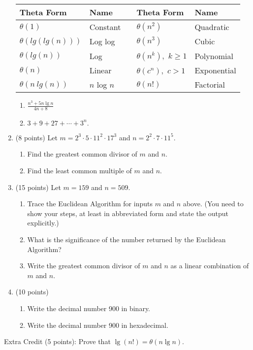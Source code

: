 \documentclass[12pt]{article}
\newcommand{\be}{\begin{enumerate}}
\newcommand{\ee}{\end{enumerate}}
\begin{document}
\begin{enumerate}
\begin{tabular}{l|l|c|l|l}
Theta Form & Name &&Theta Form & Name \\
\hline
\hline
$\theta(1)$& Constant &&$\theta(n^2)$&Quadratic\\
\hline
$\theta(lg(lg(n)))$& Log log&& $\theta(n^3)$&Cubic\\
\hline 
$\theta(lg(n))$& Log && $\theta(n^k),$ $k \geq 1$&Polynomial\\
\hline 
$\theta(n)$&Linear&& $\theta(c^n),$ $c>1$&Exponential\\
\hline 
$\theta(n~lg(n))$& $n$ log $n$&& $\theta(n!)$&Factorial\\
\hline 
\end{tabular}
\be
\item $\frac{n^3+5n\lg n}{4n+8}$
\vfill
\item $3+9+27+\cdots+3^n.$
\vfill
\ee
\newpage
\item (8 points) Let $m=2^3\cdot 5\cdot 11^2\cdot 17^3$ and $n=2^2\cdot 7 \cdot 11^5.$
\be
\item Find the greatest common divisor of $m$ and $n.$\\
\vfill
\item Find the least common multiple of $m$ and $n.$\\
\vfill
\ee
\item (15 points) Let $m=159$ and $n=509.$
\be
\item Trace the Euclidean Algorithm for inputs $m$ and $n$ above. (You need to show your steps, at least in abbreviated form and state the output explicitly.)
\vspace{3in}
\item What is the significance of the number returned by the Euclidean Algorithm?
\vspace{.3in}
\item Write the greatest common divisor of $m$ and $n$ as a linear combination of $m$ and $n.$
\vspace{2in}
\ee
\newpage
\item (10 points)
\be
\item Write the decimal number 900 in binary.
\vfill
\item Write the decimal number 900 in hexadecimal.
\vfill
\ee
\end{enumerate}
Extra Credit (5 points): Prove that $\lg (n!) = \theta(n \lg n).$
\vfill
\end{document}
